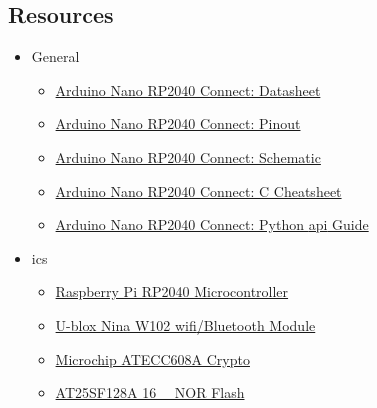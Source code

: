 \documentclass[aspectratio=169]{beamer}
\begin{document}
\subsection{Resources}
\begin{frame}
    \begin{itemize}
        \item General
              \begin{itemize}
                  \item \href{https://content.arduino.cc/assets/ABX00053-datasheet.pdf}{Arduino\textregistered{} Nano RP2040 Connect: Datasheet}
                  \item \href{https://content.arduino.cc/assets/Pinout\_NanoRP2040\_latest\%20\%281\%29.png}{Arduino\textregistered{} Nano RP2040 Connect: Pinout}
                  \item \href{https://content.arduino.cc/assets/ABX00053-schematics.pdf}{Arduino\textregistered{} Nano RP2040 Connect: Schematic}
                  \item \href{https://docs.arduino.cc/tutorials/nano-rp2040-connect/rp2040-01-technical-reference}{Arduino\textregistered{} Nano RP2040 Connect: C Cheatsheet}
                  \item \href{https://docs.arduino.cc/tutorials/nano-rp2040-connect/rp2040-python-api}{Arduino\textregistered{} Nano RP2040 Connect: Python\textregistered{} \acs{api} Guide}
              \end{itemize}
        \item \acsp{ic}
              \begin{itemize}
                  \item \href{https://datasheets.raspberrypi.com/rp2040/rp2040-datasheet.pdf}{Raspberry Pi RP2040 Microcontroller}
                  \item \href{https://content.u-blox.com/sites/default/files/NINA-W10\_DataSheet\_UBX-17065507.pdf}{U-blox\textregistered{} Nina W102 \acs{wifi}/Bluetooth Module}
                  \item \href{https://ww1.microchip.com/downloads/en/DeviceDoc/40001977A.pdf}{Microchip\textregistered{} ATECC608A Crypto}
                  \item \href{https://www.renesas.com/in/en/document/dst/at25sf128a-datasheet?r=1608781}{AT25SF128A \SI{16}{\mebi\byte} NOR Flash}

\end{itemize}
\end{itemize}
\end{frame}
\end{document}
